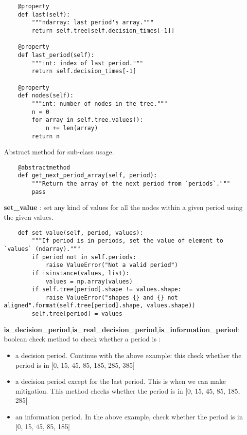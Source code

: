 \documentclass[12pt]{article}
\begin{document}
\begin{verbatim}
	@property
	def last(self):
		"""ndarray: last period's array."""
		return self.tree[self.decision_times[-1]]

	@property
	def last_period(self):
		"""int: index of last period."""
		return self.decision_times[-1]

	@property
	def nodes(self):
		"""int: number of nodes in the tree."""
		n = 0
		for array in self.tree.values():
			n += len(array)
		return n
\end{verbatim}
Abstract method for sub-class usage.
\begin{verbatim}
	@abstractmethod
	def get_next_period_array(self, period):
		"""Return the array of the next period from `periods`."""
		pass
\end{verbatim}
\textbf{set\_value} : set any kind of values for all the nodes within a given period using the given values.
\begin{verbatim}
	def set_value(self, period, values):
		"""If period is in periods, set the value of element to `values` (ndarray)."""
		if period not in self.periods:
			raise ValueError("Not a valid period")
		if isinstance(values, list):
			values = np.array(values)
		if self.tree[period].shape != values.shape:
			raise ValueError("shapes {} and {} not aligned".format(self.tree[period].shape, values.shape))
		self.tree[period] = values
\end{verbatim}
\textbf{is\_decision\_period},\textbf{is\_real\_decision\_period},\textbf{is\_information\_period}:
boolean check method to check whether a period is :
\begin{itemize}
  \item a decision period. Continue with the above example: this check whether the period is in [0, 15, 45, 85, 185, 285, 385]
  \item a decision period except for the last period. This is when we can make mitigation. This method checks whether the period is in [0, 15, 45, 85, 185, 285]
  \item an information period.  In the above example, check whether the period is in [0, 15, 45, 85, 185]
\end{itemize}
\end{document}
